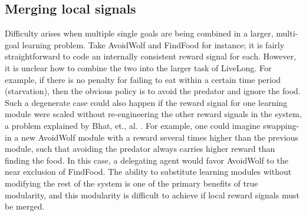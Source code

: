 
\subsection{Merging local signals}

Difficulty arises when multiple single goals are being combined in a larger, multi-goal learning problem. Take AvoidWolf and FindFood for instance; it is fairly straightforward to code an internally consistent reward signal for each.  However, it is unclear how to combine the two into the larger task of LiveLong.  For example, if there is no penalty for failing to eat within a certain time period (starvation), then the obvious policy is to avoid the predator and ignore the food.  Such a degenerate case could also happen if the reward signal for one learning module were scaled without re-engineering the other reward signals in the system, a problem explained by Bhat, et., al. \cite{bhat2006on-the-difficulty}. For example, one could imagine swapping-in a new AvoidWolf module with a reward several times higher than the previous module, such that avoiding the predator always carries higher reward than finding the food.  In this case, a delegating agent would favor AvoidWolf to the near exclusion of FindFood.  The ability to substitute learning modules without modifying the rest of the system is one of the primary benefits of true modularity, and this modularity is difficult to achieve if local reward signals must be merged.

